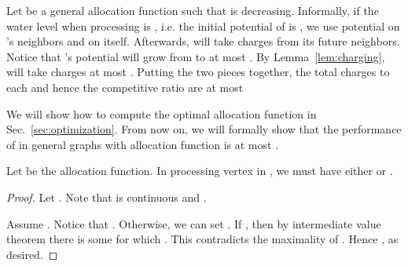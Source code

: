 \documentclass{article}
\begin{document}
Let  be a general allocation function such that  is decreasing. Informally, if the water level when processing  is , i.e. the initial potential of  is , we use potential  on 's neighbors and  on  itself. Afterwards,  will take charges from its future neighbors. Notice that 's potential will grow from  to at most . By Lemma~\ref{lem:charging},  will take charges at most . Putting the two pieces together, the total charges to each  and hence the competitive ratio are at most 


We will show how to compute the optimal allocation function  in Sec.~\ref{sec:optimization}. From now on, we will formally show that the performance of  in general graphs with allocation function  is at most .







\begin{lemma}
Let  be the allocation function.
In processing vertex  in , we must have either  or .
\end{lemma}
\begin{proof}
Let . Note that  is continuous and .

Assume . Notice that . Otherwise, we can set . If , then by intermediate value theorem there is some  for which . This contradicts the maximality of . Hence , as desired.
\end{proof}
\end{document}
